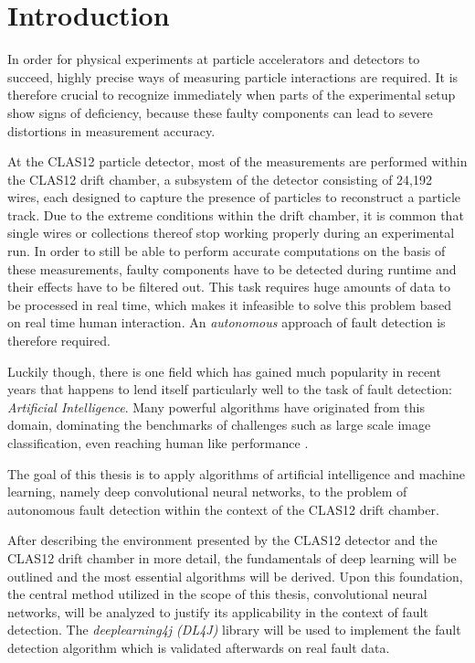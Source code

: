 \chapter{Introduction}

In order for physical experiments at particle accelerators and
detectors to succeed, highly precise ways
of measuring particle interactions are required. It is therefore
crucial to recognize immediately when parts of the experimental setup
show signs of deficiency, because these faulty components can lead to
severe distortions in measurement accuracy.

At the CLAS12 particle detector, most of the measurements are
performed within the CLAS12 drift chamber, a subsystem of the detector
consisting of 24,192 wires, each designed to capture the presence of
particles to reconstruct a particle track. Due to the extreme
conditions within the drift chamber, it
is common that single wires or collections thereof stop working
properly during an experimental run. In order to still be able to
perform accurate computations on the basis of these measurements,
faulty components have to be detected during runtime and their effects
have to be filtered out. This task requires huge amounts of data to be
processed in real time, which makes it infeasible to solve this
problem based on real time human interaction. An \textit{autonomous}
approach of fault detection is therefore required.

Luckily though, there is one field which has gained much popularity
in recent years that happens to lend itself particularly well to
the task of fault detection: \textit{Artificial
  Intelligence}. Many powerful algorithms have originated from this
domain, dominating the benchmarks of challenges such
as large scale image classification, even reaching human like
performance \cite{Russakovsky}.

The goal of this thesis is to apply algorithms of artificial
intelligence and machine learning, namely deep convolutional neural
networks, to the problem of autonomous fault detection within the
context of the CLAS12 drift chamber.

After describing the environment presented by the CLAS12 detector and
the CLAS12 drift chamber in more detail, the fundamentals of deep
learning will be outlined and the most essential algorithms will be
derived. Upon this foundation, the central method utilized in the
scope of this thesis, convolutional neural networks, will be analyzed
to justify its applicability in the context of fault detection. The
\textit{deeplearning4j (DL4J)} library will be used to implement the
fault detection algorithm which is validated afterwards on real fault
data.
